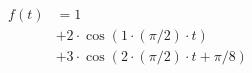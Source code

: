 \begin{center}
\begin{align*}
f(t) &= 1 \\
&+ 2 \cdot \cos( 1 \cdot (\pi/2) \cdot t ) \\
&+ 3 \cdot \cos( 2 \cdot (\pi/2) \cdot t + \pi/8)
\end{align*}
\end{center}
